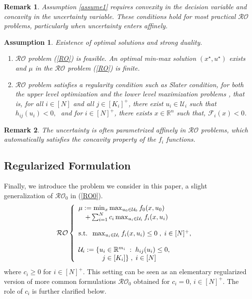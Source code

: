 \documentclass[journal,twoside,web]{ieeecolor}
\newcommand{\rev}[1]{\textcolor{revisionblue}{#1}}
\newtheorem{assumption}[theorem]{Assumption}
\newtheorem{remark}{Remark}
\begin{document}
\begin{remark}
Assumption \ref{assume1} requires convexity in the decision variable and concavity in the uncertainty variable. These conditions hold for most practical $\mathcal{RO}$ problems, particularly when uncertainty enters affinely.
\end{remark}

\begin{assumption} \label{assume_feasible} Existence of optimal solutions and strong duality.

\begin{enumerate}
\item $\mathcal{RO}$ problem (\ref{RO}) is feasible. An optimal min-max solution $(x^\star,u^\star)$ exists and $\mu$ in the $\mathcal{RO}$ problem (\ref{RO}) is finite.
\item $\mathcal{RO}$ problem satisfies \rev{a regularity condition such as Slater condition}, for both the upper level optimization and the lower level maximization problems
\cite{bental2009-2}, that is,
for all $i\in[N]$ and all $j\in[K_i]^+$, there exist $u_i \in \mathcal{U}_i$ such that $h_{ij}(u_i)<0,\;$  and
for $i\in[N]^+$,  there exists $x \in \mathbb{R}^n$ such that, $\mathcal{F}_i(x)<0$\;.
\end{enumerate}
\end{assumption}
\begin{remark}
The uncertainty is often parametrized affinely in $\mathcal{RO}$ problems, which automatically satisfies the concavity property of the $f_i$ functions.
\end{remark}

\subsection*{Regularized Formulation}

Finally, we introduce the problem we consider in this paper, a slight generalization of $\mathcal{RO}_0$ in (\ref{RO0}).
\begin{equation}\mathcal{RO}\left\{\begin{array}{l}
\mu:=\min_{x} \max_{u_0\in \mathcal{U}_0} f_0(x,u_0)\\
\quad +\sum_{i=1}^N c_i \max_{u_i\in \mathcal{U}_i} f_i(x,u_i)\label{RO}\\ \\
\text{s.t.}\;\;\max_{u_i\in \mathcal{U}_i} f_i(x,u_i)\leq 0\;,\;i\in[N]^+,\\ \\
\mathcal{U}_i:=\{u_i\in \mathbb{R}^{m_i}\;:\;h_{ij}(u_i)\leq 0,\\
\hspace{3.5em} j\in[K_i]\}\;,\;i\in[N]
\end{array}\right.
\end{equation}
where $c_i\geq 0$ for $i\in[N]^+$. This setting can be seen as an elementary regularized version of more common formulations $\mathcal{RO}_0$ obtained for $c_i=0$, $i\in[N]^+$.
The role of $c_i$ is further clarified below.
\end{document}
